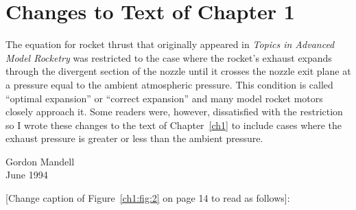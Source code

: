\chapter{Changes to Text of Chapter 1}\label{supp:ch1}

The equation for rocket thrust that originally appeared in \emph{Topics in Advanced Model Rocketry} was
restricted to the case where the rocket's exhaust expands through the divergent section of the nozzle until
it crosses the nozzle exit plane at a pressure equal to the ambient atmospheric pressure. This condition is
called ``optimal expansion'' or ``correct expansion'' and many model rocket motors closely approach it. Some
readers were, however, dissatisfied with the restriction so I wrote these changes to the text of
Chapter~\ref{ch1} to include cases where the exhaust pressure is greater or less than the ambient pressure.

\bigskip
\noindent Gordon Mandell\\
June 1994

\bigskip
\begin{center}
[Change caption of Figure~\ref{ch1:fig:2} on page 14 to read as follows]:
\end{center}

